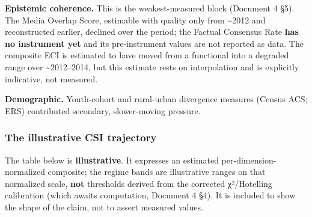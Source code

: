 \documentclass[
]{article}
\begin{document}
\textbf{Epistemic coherence.} This is the weakest-measured block
(Document 4 §5). The Media Overlap Score, estimable with quality only
from \textasciitilde2012 and reconstructed earlier, declined over the
period; the Factual Consensus Rate \textbf{has no instrument yet} and
its pre-instrument values are not reported as data. The composite ECI is
estimated to have moved from a functional into a degraded range over
\textasciitilde2012--2014, but this estimate rests on interpolation and
is explicitly indicative, not measured.

\textbf{Demographic.} Youth-cohort and rural-urban divergence measures
(Census ACS; ERS) contributed secondary, slower-moving pressure.

\subsubsection{The illustrative CSI
trajectory}\label{the-illustrative-csi-trajectory}

The table below is \textbf{illustrative}. It expresses an estimated
per-dimension-normalized composite; the regime bands are illustrative
ranges on that normalized scale, \textbf{not} thresholds derived from
the corrected χ²/Hotelling calibration (which awaits computation,
Document 4 §4). It is included to show the shape of the claim, not to
assert measured values.
\end{document}
